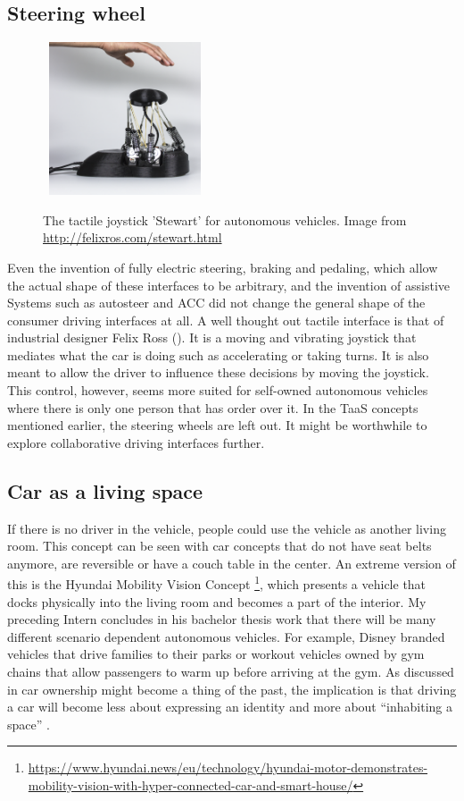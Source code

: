 \subsection{Steering wheel}\label{ssec:steering}
\begin{figure}
   \hfill\ \includegraphics[width=0.4\textwidth]{fig/joystick}\hfill\
    \caption[The tactile joystick 'Stewart' for autonomous vehicles]{The tactile joystick 'Stewart' for autonomous vehicles. Image from \url{http://felixros.com/stewart.html}}
    \label{fig:joystick}
\end{figure}
Even the invention of fully electric steering, braking and pedaling, which allow the actual shape of these interfaces to be arbitrary, and the invention of assistive Systems such as autosteer and ACC did not change the general shape of the consumer driving interfaces at all. A well thought out tactile interface is that of industrial designer Felix Ross (). It is a moving and vibrating joystick that mediates what the car is doing such as accelerating or taking turns. It is also meant to allow the driver to influence these decisions by moving the joystick. This control, however, seems more suited for self-owned autonomous vehicles where there is only one person that has order over it. In the TaaS concepts mentioned earlier, the steering wheels are left out. It might be worthwhile to explore collaborative driving interfaces further. 

\subsection{Car as a living space}\label{ssec:living}
If there is no driver in the vehicle, people could use the vehicle as another living room. This concept can be seen with car concepts that do not have seat belts anymore, are reversible or have a couch table in the center. An extreme version of this is the Hyundai Mobility Vision Concept \footnote{\url{https://www.hyundai.news/eu/technology/hyundai-motor-demonstrates-mobility-vision-with-hyper-connected-car-and-smart-house/}}, which presents a vehicle that docks physically into the living room and becomes a part of the interior. My preceding Intern concludes in his bachelor thesis work that there will be many different scenario dependent autonomous vehicles. For example, Disney branded vehicles that drive families to their parks or workout vehicles owned by gym chains that allow passengers to warm up before arriving at the gym\cite{Honma2017SystemVehicles}. As discussed in  car ownership might become a thing of the past, the implication is that driving a car will become less about expressing an identity and more about “inhabiting a space” \cite{Laurier2012WhatCar}.

